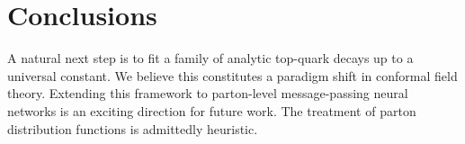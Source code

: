 \section{Conclusions}\label{sec:conclusions}

A natural next step is to fit a family of analytic top-quark decays up
to a universal constant. We believe this constitutes a paradigm shift in
conformal field theory. Extending this framework to parton-level
message-passing neural networks is an exciting direction for future
work. The treatment of parton distribution functions is admittedly
heuristic.

